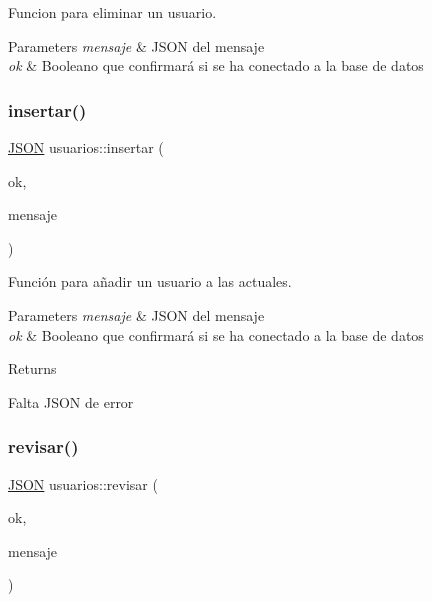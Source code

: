 Funcion para eliminar un usuario. 


\begin{DoxyParams}{Parameters}
{\em mensaje} & J\+S\+ON del mensaje \\
\hline
{\em ok} & Booleano que confirmará si se ha conectado a la base de datos \\
\hline
\end{DoxyParams}
\mbox{\label{classusuarios_a6939c773dde8627785009eacd28dd9a8}} 
\subsubsection{\texorpdfstring{insertar()}{insertar()}}
{\footnotesize\ttfamily \mbox{\hyperlink{classnlohmann_1_1basic__json}{J\+S\+ON}} usuarios\+::insertar (\begin{DoxyParamCaption}\item[{bool}]{ok,  }\item[{\mbox{\hyperlink{classnlohmann_1_1basic__json}{J\+S\+ON}}}]{mensaje }\end{DoxyParamCaption})}



Función para añadir un usuario a las actuales. 


\begin{DoxyParams}{Parameters}
{\em mensaje} & J\+S\+ON del mensaje \\
\hline
{\em ok} & Booleano que confirmará si se ha conectado a la base de datos \\
\hline
\end{DoxyParams}
\begin{DoxyReturn}{Returns}

\end{DoxyReturn}
Falta J\+S\+ON de error \mbox{\label{classusuarios_ad875eae5fff50925fa35dfa80728a87e}} 
\subsubsection{\texorpdfstring{revisar()}{revisar()}}
{\footnotesize\ttfamily \mbox{\hyperlink{classnlohmann_1_1basic__json}{J\+S\+ON}} usuarios\+::revisar (\begin{DoxyParamCaption}\item[{bool}]{ok,  }\item[{\mbox{\hyperlink{classnlohmann_1_1basic__json}{J\+S\+ON}}}]{mensaje }\end{DoxyParamCaption})}



